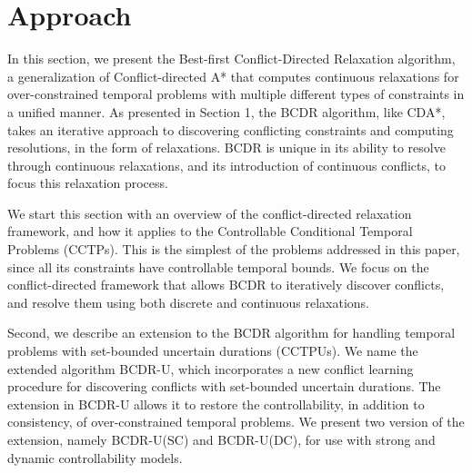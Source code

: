 \documentclass[jair,twoside,11pt,theapa]{article}
\begin{document}


\section{Approach}


In this section, we present the Best-first Conflict-Directed Relaxation
algorithm, a generalization of Conflict-directed A* \cite{Williams_CDAstar_2002}
that computes continuous relaxations for over-constrained temporal problems with
multiple different types of constraints in a unified manner. As presented in
Section 1, the BCDR algorithm, like CDA*, takes an iterative approach to discovering
conflicting constraints and computing resolutions, in the form of relaxations.
BCDR is unique in its ability to resolve through continuous relaxations, and its
introduction of continuous conflicts, to focus this relaxation process.


We start this section with an overview of the conflict-directed relaxation
framework, and how it applies to the Controllable Conditional Temporal Problems
(CCTPs). This is the simplest of the problems addressed in this paper, since all
its constraints have controllable temporal bounds. We focus on the conflict-directed framework that allows BCDR to iteratively discover conflicts, and resolve them using both discrete and continuous relaxations. 


Second, we describe an extension to the BCDR algorithm for handling temporal
problems with set-bounded uncertain durations (CCTPUs). We name the extended
algorithm BCDR-U, which incorporates a new conflict learning procedure for
discovering conflicts with set-bounded uncertain durations. The extension in BCDR-U
allows it to restore the controllability, in addition to consistency, of
over-constrained temporal problems. We present two version of the extension, namely BCDR-U(SC) and BCDR-U(DC), for use with strong and dynamic controllability models. 


%
%
%
%
%
%
\end{document}
